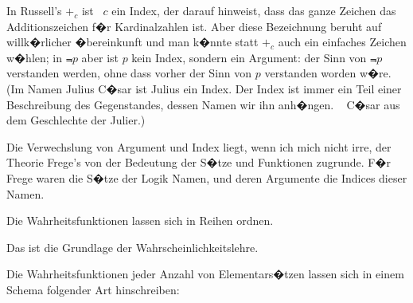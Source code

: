 \begin{propositions}
{In Russell's \glqq{}$+_{c}$\grqq{} ist \zumBeispiel\ \glqq{}$c$\grqq{} ein Index, der darauf
hinweist, dass das ganze Zeichen das Additionszeichen
f�r Kardinalzahlen ist. Aber diese Bezeichnung
beruht auf willk�rlicher �bereinkunft und
man k�nnte statt \glqq{}$+_{c}$\grqq{} auch ein einfaches Zeichen
w�hlen; in \glqq{}$\Not{p}$\grqq{} aber ist \glqq{}$p$\grqq{} kein Index, sondern
ein Argument: der Sinn von \glqq{}$\Not{p}$\grqq{} 
verstanden werden, ohne dass vorher der Sinn von
\glqq{}$p$\grqq{} verstanden worden w�re. (Im Namen Julius
C�sar ist \glqq{}Julius\grqq{} ein Index. Der Index ist immer
ein Teil einer Beschreibung des Gegenstandes,
dessen Namen wir ihn anh�ngen. \ZumBeispiel\ 
C�sar aus dem Geschlechte der Julier.)

Die Verwechslung von Argument und Index
liegt, wenn ich mich nicht irre, der Theorie Frege's
von der Bedeutung der S�tze und Funktionen
zugrunde. F�r Frege waren die S�tze der Logik
Namen, und deren Argumente die Indices dieser
Namen.}


{Die Wahrheitsfunktionen lassen sich in Reihen
ordnen.

Das ist die Grundlage der Wahrscheinlichkeitslehre.}


{Die Wahrheitsfunktionen jeder Anzahl von
Elementars�tzen lassen sich in einem Schema
folgender Art hinschreiben:

}
\end{propositions}
